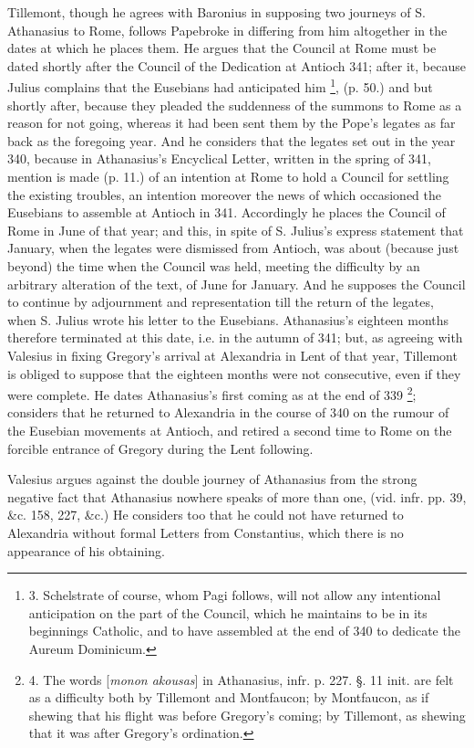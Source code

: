 Tillemont, though he agrees
with Baronius in supposing two journeys of S. Athanasius to Rome,
follows Papebroke in differing from him altogether in the dates at
which he places them. He argues that the Council at Rome must be dated
shortly after the Council of the Dedication at Antioch 341; after it,
because Julius complains that the Eusebians had anticipated him \footnote{3.
Schelstrate of course, whom Pagi follows, will not allow any
intentional anticipation on the part of the Council, which he
maintains to be in its beginnings Catholic, and to have assembled at
the end of 340 to dedicate the Aureum Dominicum.}, (p. 50.) and but shortly after, because they pleaded the
suddenness of the summons to Rome as a reason for not going, whereas
it had been sent them by the Pope's legates as far back as the
foregoing year. And he considers that the legates set out in the year
340, because in Athanasius's Encyclical Letter, written in the spring
of 341, mention is made (p. 11.) of an intention at Rome to hold a
Council for settling the existing troubles, an intention moreover the
news of which occasioned the Eusebians to assemble at Antioch in 341.
Accordingly he places the Council of Rome in June of that year; and
this, in spite of S. Julius's express statement that January, when the
legates were dismissed from Antioch, was about (because just beyond)
the time when the Council was held, meeting the difficulty by an
arbitrary alteration of the text, of June for January. And he supposes
the Council to continue by adjournment and representation till the
return of the legates, when S. Julius wrote his letter to the
Eusebians. Athanasius's eighteen months therefore terminated at this
date, i.e. in the autumn of 341; but, as agreeing with Valesius in
fixing Gregory's arrival at Alexandria in Lent of that year, Tillemont
is obliged to suppose that the eighteen months were not consecutive,
even if they were complete. He dates Athanasius's first coming as at
the end of 339 \footnote{4. The
words [\emph{monon akousas}] in Athanasius, infr. p. 227. §. 11 init.
are felt as a difficulty both by Tillemont and Montfaucon; by
Montfaucon, as if shewing that his flight was before Gregory's coming;
by Tillemont, as shewing that it was after Gregory's ordination.}; considers
that he returned to Alexandria in the course of 340 on the rumour
of the Eusebian movements at Antioch, and retired a second time to
Rome on the forcible entrance of Gregory during the Lent following.

Valesius argues against the
double journey of Athanasius from the strong negative fact that
Athanasius nowhere speaks of more than one, (vid. infr. pp. 39,
\&c. 158, 227, \&c.) He considers too that he could not have
returned to Alexandria without formal Letters from Constantius, which
there is no appearance of his obtaining.

